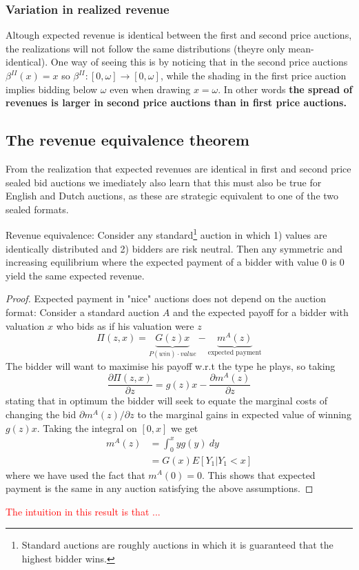 \subsubsection{Variation in realized revenue}
Altough expected revenue is identical between the first and second price auctions, the realizations will not follow the same distributions (theyre only mean-identical). One way of seeing this is by noticing that in the second price auctions $\beta^{II}(x)=x$ so $\beta^{II}: [0, \omega] \rightarrow [0, \omega]$, while the shading in the first price auction implies bidding below $\omega$ even when drawing $x=\omega$. In other words \textbf{the spread of revenues is larger in second price auctions than in first price auctions.}


\subsection{The revenue equivalence theorem}
From the realization that expected revenues are identical in first and second price sealed bid auctions we imediately also learn that this must also be true for English and Dutch auctions, as these are strategic equivalent to one of the two sealed formats.

\begin{proposition}{Revenue equivalence:}
Consider any standard\footnote{Standard auctions are roughly auctions in which it is guaranteed that the highest bidder wins.} auction in which 1) values are identically distributed and 2) bidders are risk neutral. Then any symmetric and increasing equilibrium where the expected payment of a bidder with value 0 is 0 yield the same expected revenue.
\end{proposition}

\begin{proof}{Expected payment in "nice" auctions does not depend on the auction format:}
Consider a standard auction $A$ and the expected payoff for a bidder with valuation $x$ who bids as if his valuation were $z$
\begin{equation}
  \Pi(z,x) = \underbrace{G(z)x}_{P(win)\cdot value} - \underbrace{m^A(z)}_{\text{expected payment}}
\end{equation}
The bidder will want to maximise his payoff w.r.t the type he plays, so taking
\begin{equation}
  \frac{\partial \Pi(z,x)}{\partial z} = g(z)x - \frac{\partial m^A(z)}{\partial z}
\end{equation}
stating that in optimum the bidder will seek to equate the marginal costs of changing the bid $\partial m^A(z)/\partial z$ to the marginal gains in expected value of winning $g(z)x$. Taking the integral on $[0,x]$ we get
\begin{equation}
  \begin{split}
  m^A(z) &= \int_0^x yg(y) \ dy \\
  &= G(x) E[Y_1 |Y_1 < x]
\end{split}
\end{equation}
where we have used the fact that $m^A(0)=0$. This shows that expected payment is the same in any auction satisfying the above assumptions.
\end{proof}
\textcolor{red}{The intuition in this result is that ...}


